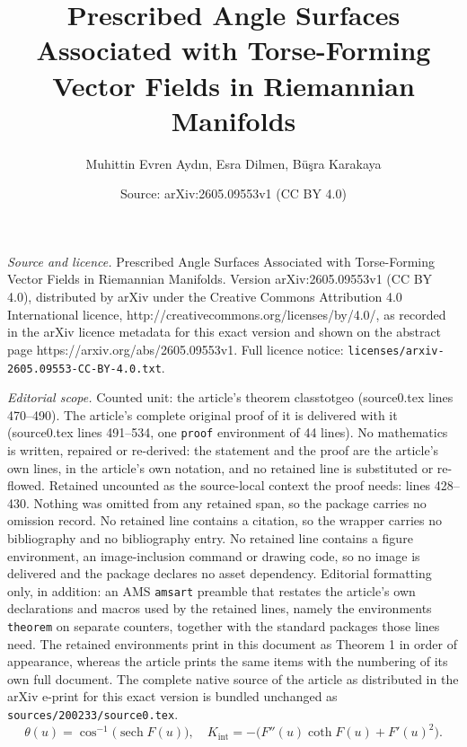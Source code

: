 \documentclass[10pt,a4paper]{amsart}
\title{Prescribed Angle Surfaces Associated with Torse-Forming Vector Fields in Riemannian Manifolds}
\author{Muhittin Evren Ayd{\i}n, Esra Dilmen, B\"u\c{s}ra Karakaya}
\date{Source: arXiv:2605.09553v1 (CC BY 4.0)}
\DeclareMathOperator{\sech}{sech}
\begin{document}
\maketitle

\noindent\emph{Source and licence.} Prescribed Angle Surfaces Associated with Torse-Forming Vector Fields in Riemannian Manifolds. Version arXiv:2605.09553v1 (CC BY 4.0), distributed by arXiv under the Creative Commons Attribution 4.0 International licence, http://creativecommons.org/licenses/by/4.0/, as recorded in the arXiv licence metadata for this exact version and shown on the abstract page https://arxiv.org/abs/2605.09553v1. Full licence notice: \texttt{licenses/arxiv-2605.09553-CC-BY-4.0.txt}.\par\smallskip

\noindent\textit{Editorial scope.} Counted unit: the article's theorem classtotgeo (source0.tex lines 470--490). The article's complete original proof of it is delivered with it (source0.tex lines 491--534, one \texttt{proof} environment of 44 lines). No mathematics is written, repaired or re-derived: the statement and the proof are the article's own lines, in the article's own notation, and no retained line is substituted or re-flowed.  Retained uncounted as the source-local context the proof needs: lines 428--430.  Nothing was omitted from any retained span, so the package carries no omission record.  No retained line contains a citation, so the wrapper carries no bibliography and no bibliography entry.  No retained line contains a figure environment, an image-inclusion command or drawing code, so no image is delivered and the package declares no asset dependency.  Editorial formatting only, in addition: an AMS \texttt{amsart} preamble that restates the article's own declarations and macros used by the retained lines, namely the environments \texttt{theorem} on separate counters, together with the standard packages those lines need.  The retained environments print in this document as Theorem 1 in order of appearance, whereas the article prints the same items with the numbering of its own full document.  The complete native source of the article as distributed in the arXiv e-print for this exact version is bundled unchanged as \texttt{sources/200233/source0.tex}.
\begin{equation}\label{tg1}
\theta(u)=\cos^{-1}\big( \sech F(u) \big), \quad K_{\mathrm{int}}=-\big(F''(u)\coth F(u)+F'(u)^2\big).
\end{equation}
\end{document}

